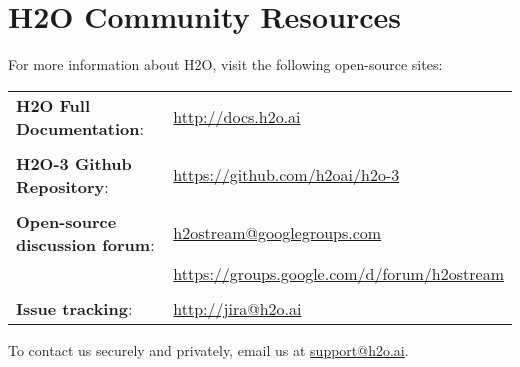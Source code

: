 \section{H2O Community Resources}

For more information about H2O, visit the following open-source sites:

\begin{tabular}{l l}
{\textbf{H2O Full Documentation}}: & \url{http://docs.h2o.ai} \\
\\
{\textbf{H2O-3 Github Repository}}: & \url{https://github.com/h2oai/h2o-3} \\
\\
{\textbf{Open-source discussion forum}}: & \href{mailto:h2ostream@googlegroups.com}{h2ostream@googlegroups.com} \\
& \url{https://groups.google.com/d/forum/h2ostream} \\
\\
{\textbf{Issue tracking}}: & \url{http://jira@h2o.ai}
\end{tabular}

\bigskip

To contact us securely and privately, email us at \href{mailto:support@h2o.ai}{support@h2o.ai}.

